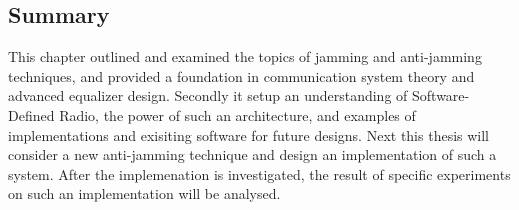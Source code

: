 \subsection{Summary}

This chapter outlined and examined the topics of jamming and anti-jamming techniques, and provided a foundation in communication system theory and advanced equalizer design.  Secondly it setup an understanding of Software-Defined Radio, the power of such an architecture, and examples of implementations and exisiting software for future designs.  Next this thesis will consider a new anti-jamming technique and design an implementation of such a system.  After the implemenation is investigated, the result of specific experiments on such an implementation will be analysed.\\
